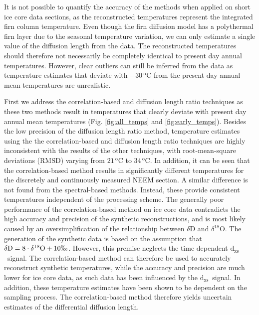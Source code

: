 \documentclass[11pt, draftcls, onecolumn]{IEEEtran} %
\numberwithin{equation}{section}
\numberwithin{table}{section}
\numberwithin{figure}{section}
\newcommand{\Dxs}{$\mathrm{d_{xs}}$}
\begin{document}
It is not possible to quantify the accuracy of the methods when applied on short ice core data sections,
as the reconstructed temperatures represent the integrated firn column temperature.
Even though the firn diffusion model has a polythermal firn layer due to the seasonal temperature variation,
we can only estimate a single value of the diffusion length from the data.
The reconstructed temperatures should therefore not necessarily be completely identical to present day annual temperatures.
However, clear outliers can still be inferred from the data as temperature estimates that deviate with
$-30\,^\mathrm{o}\mathrm{C}$ from the present day annual mean temperatures are unrealistic.

First we address the correlation-based and diffusion length ratio techniques as these two
methods result in temperatures that clearly deviate with present day annual mean temperatures (Fig. \ref{fig:all_temps} and \ref{fig:early_temps}).
Besides the low precision of the diffusion length ratio method, 
temperature estimates using the the correlation-based and diffusion length ratio techniques 
are highly inconsistent with the results of the 
other techniques, with root-mean-square deviations (RMSD) varying from $21\, ^\mathrm{o}\mathrm{C}$ to $34 \, ^\mathrm{o}\mathrm{C}$. 
In addition, it can be seen that the correlation-based method results in significantly different 
temperatures for the discretely and continuously measured NEEM section.
A similar difference is not found from the spectral-based methods. Instead, these provide
consistent temperatures independent of the processing scheme.
The generally poor performance of the correlation-based method on ice core data contradicts the high accuracy and precision of the synthetic reconstructions, and is most likely caused by an oversimplification of the relationship between $\delta\mathrm{D}$ and $\delta^{18}\mathrm{O}$. The generation of the synthetic data is based on the assumption that $\delta\mathrm{D} = 8\cdot \delta^{18}\mathrm{O} + 10 \permil$. However, this premise neglects the time dependent \Dxs~signal. 
The correlation-based method can therefore be used to accurately reconstruct synthetic temperatures, while the accuracy and precision are much lower for ice core data,
as such data has been influenced by the \Dxs~signal.
In addition, these temperature estimates have been shown to be dependent on the sampling process. The correlation-based method therefore yields uncertain estimates of the differential diffusion length.
\end{document}
